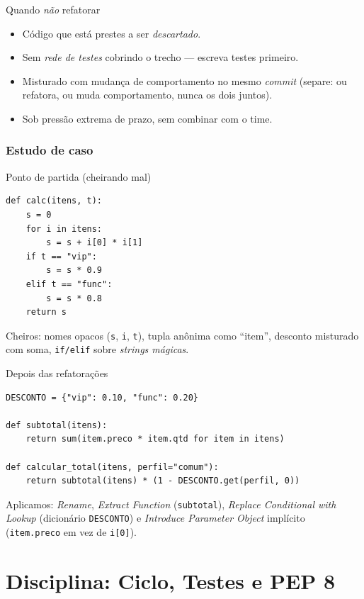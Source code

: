 \documentclass[aspectratio=169]{beamer}
\begin{document}
\begin{frame}{Quando \emph{não} refatorar}
  \begin{itemize}
    \item Código que está prestes a ser \emph{descartado}.
    \item Sem \emph{rede de testes} cobrindo o trecho --- escreva testes primeiro.
    \item Misturado com mudança de comportamento no mesmo \emph{commit}
          (separe: ou refatora, ou muda comportamento, nunca os dois juntos).
    \item Sob pressão extrema de prazo, sem combinar com o time.
  \end{itemize}
\end{frame}

\section{Estudo de caso}

\begin{frame}[fragile]{Ponto de partida (cheirando mal)}
\begin{lstlisting}
def calc(itens, t):
    s = 0
    for i in itens:
        s = s + i[0] * i[1]
    if t == "vip":
        s = s * 0.9
    elif t == "func":
        s = s * 0.8
    return s
\end{lstlisting}
\small Cheiros: nomes opacos (\texttt{s}, \texttt{i}, \texttt{t}),
tupla anônima como ``item'', desconto misturado com soma,
\texttt{if/elif} sobre \emph{strings mágicas}.
\end{frame}

\begin{frame}[fragile]{Depois das refatorações}
\begin{lstlisting}
DESCONTO = {"vip": 0.10, "func": 0.20}

def subtotal(itens):
    return sum(item.preco * item.qtd for item in itens)

def calcular_total(itens, perfil="comum"):
    return subtotal(itens) * (1 - DESCONTO.get(perfil, 0))
\end{lstlisting}
\small Aplicamos: \emph{Rename}, \emph{Extract Function}
(\texttt{subtotal}), \emph{Replace Conditional with Lookup}
(dicionário \texttt{DESCONTO}) e \emph{Introduce Parameter Object}
implícito (\texttt{item.preco} em vez de \texttt{i[0]}).
\end{frame}

\part{Disciplina: Ciclo, Testes e PEP 8}
\end{document}
